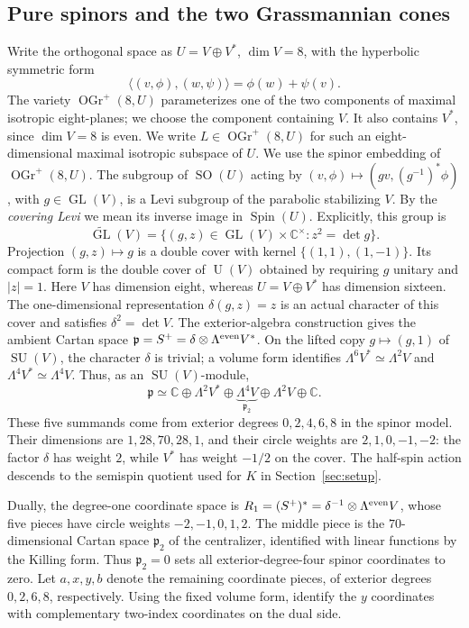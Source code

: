 \documentclass[11pt]{article}
\newcommand{\C}{\mathbb C}
\newcommand{\OGr}{\operatorname{OGr}}
\newcommand{\SO}{\operatorname{SO}}
\newcommand{\SU}{\operatorname{SU}}
\newcommand{\Spin}{\operatorname{Spin}}
\newcommand{\fp}{\mathfrak p}
\theoremstyle{definition}
\numberwithin{equation}{section}
\begin{document}
\subsection{Pure spinors and the two Grassmannian cones}
Write the orthogonal space as $U=V\oplus V^*$, $\dim V=8$,
with the hyperbolic symmetric form
\[
 \langle(v,\phi),(w,\psi)\rangle=\phi(w)+\psi(v).
\]
The variety $\OGr^+(8,U)$ parameterizes one of the two components
of maximal isotropic eight-planes; we choose the component containing
$V$. It also contains $V^*$, since $\dim V=8$ is even.
We write $L\in\OGr^+(8,U)$ for such an eight-dimensional maximal
isotropic subspace of $U$. We use the spinor embedding of $\OGr^+(8,U)$.
The subgroup of $\SO(U)$ acting by
$(v,\phi)\mapsto(gv,(g^{-1})^*\phi)$, with $g\in\operatorname{GL}(V)$,
is a Levi subgroup of the parabolic stabilizing $V$.
By the \emph{covering Levi} we mean its inverse image in $\Spin(U)$.
Explicitly, this group is
\[
 \widetilde{\operatorname{GL}}(V)
   =\{(g,z)\in\operatorname{GL}(V)\times\C^\times:z^2=\det g\}.
\]
Projection $(g,z)\mapsto g$ is a double cover with kernel
$\{(1,1),(1,-1)\}$. Its compact form is the double cover of
$\operatorname{U}(V)$ obtained by requiring $g$ unitary and $|z|=1$.
Here $V$ has dimension eight, whereas
$U=V\oplus V^*$ has dimension sixteen.
The one-dimensional representation $\delta(g,z)=z$ is an actual
character of this cover and satisfies $\delta^2=\det V$.
The exterior-algebra construction gives the ambient Cartan space
$\fp=S^+=\delta\otimes\Lambda^{\rm even}V^*$.
On the lifted copy $g\mapsto(g,1)$ of $\SU(V)$, the character
$\delta$ is trivial; a volume form
identifies $\Lambda^6V^*\simeq\Lambda^2V$ and
$\Lambda^4V^*\simeq\Lambda^4V$. Thus, as an $\SU(V)$-module,
\[
 \fp\simeq\C\oplus\Lambda^2V^*
       \oplus\underbrace{\Lambda^4V}_{\fp_2}
       \oplus\Lambda^2V\oplus\C.
\]
These five summands come from exterior degrees $0,2,4,6,8$ in the
spinor model. Their dimensions are $1,28,70,28,1$, and their circle
weights are $2,1,0,-1,-2$: the factor $\delta$ has weight $2$,
while $V^*$ has weight $-1/2$ on the cover.
The half-spin action descends to the semispin quotient used for $K$
in Section~\ref{sec:setup}.

Dually, the degree-one coordinate space is
$R_1=(S^+)^*=\delta^{-1}\otimes\Lambda^{\rm even}V$,
whose five pieces have circle weights $-2,-1,0,1,2$.
The middle piece is the $70$-dimensional Cartan space $\fp_2$ of the
centralizer, identified with linear functions by the Killing form.
Thus $\fp_2=0$ sets all exterior-degree-four spinor coordinates to zero.
Let $a,x,y,b$ denote the remaining coordinate pieces, of exterior
degrees $0,2,6,8$, respectively. Using the fixed volume form, identify
the $y$ coordinates with complementary two-index coordinates on the
dual side.
\end{document}
